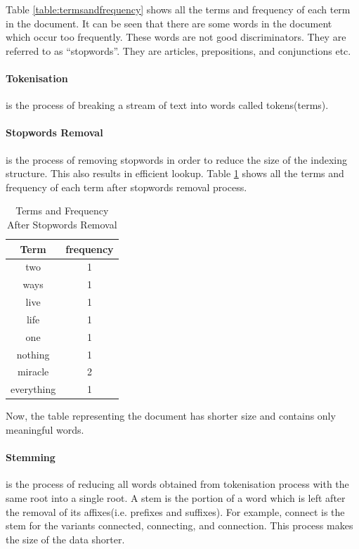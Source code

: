 Table \ref{table:termsandfrequency} shows all the terms and frequency of each term in the document. It can be seen that there are some words in the 
document which occur too frequently. These words are not good discriminators. They are referred to as ``stopwords''. They are
articles, prepositions, and conjunctions etc.

\paragraph{Tokenisation}
is the process of breaking a stream of text into words called tokens(terms). 

\paragraph{Stopwords Removal}
is the process of removing stopwords in order to reduce the size of the indexing structure. This also results in efficient lookup.
Table \ref{table:stopwordsremoval} shows all the terms and frequency of each term after stopwords removal process.

\begin{table}
\centering
\begin{tabular}{|c|c|}
\hline \textbf{Term} & \textbf{frequency} \\
\hline two & 1 \\
\hline ways & 1 \\
\hline live & 1 \\
\hline life & 1 \\
\hline one & 1 \\
\hline nothing & 1 \\
\hline miracle & 2 \\
\hline everything & 1 \\  
\hline
\end{tabular}
\caption{Terms and Frequency After Stopwords Removal} \label{table:stopwordsremoval}
\end{table}
Now, the table representing the document has shorter size and contains only meaningful words.

\paragraph{Stemming} is the process of reducing all words obtained from tokenisation process with the same root into a single root. A stem is the portion of a word which is left after
the removal of its affixes(i.e. prefixes and suffixes). For example, connect is the stem for the variants connected, connecting, and connection.
This process makes the size of the data shorter. 

